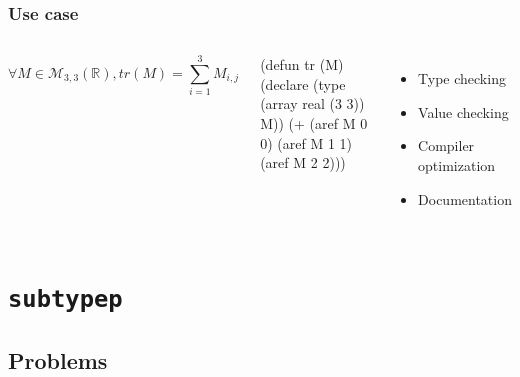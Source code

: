 \documentclass[aspectratio=169]{beamer}
\renewcommand\code[1]{\texttt{#1}}
\begin{document}
\begin{frame}[fragile]
  \frametitle{Use case}
  \begin{columns}
    \column{0pt}
    \column{.6\paperwidth}
    \[
      \forall M \in \mathcal M_{3,3}(\mathbb R), tr(M) = \sum_{i=1}^3 M_{i,j}
    \]
\begin{clcode}
(defun tr (M)
  (declare (type (array real (3 3)) M))
  (+ (aref M 0 0)
     (aref M 1 1)
     (aref M 2 2)))
\end{clcode}

    \begin{itemize}
    \item Type checking
    \item Value checking
    \item Compiler optimization
    \item Documentation
    \end{itemize}
  \end{columns}
\end{frame}

\section{\code{subtypep}}
\subsection{Problems}
\end{document}
